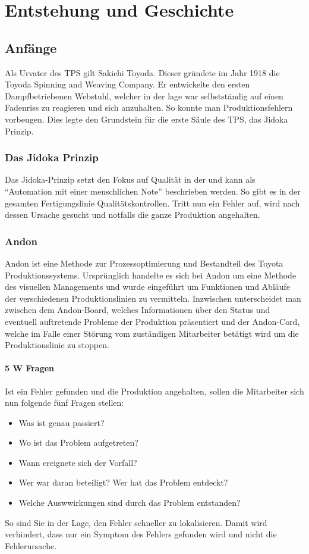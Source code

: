 \documentclass[00_ToyotaProduktionssystem.tex]{subfiles}
\begin{document}
\chapter{Entstehung und Geschichte}
\label{chap:ENTSTEHUNG}
\section{Anfänge}
Als Urvater des TPS gilt Sakichi Toyoda. Dieser gründete im Jahr 1918 die Toyoda Spinning and Weaving Company. Er entwickelte den ersten Dampfbetriebenen Webstuhl, welcher in der lage war selbstständig auf einen Fadenriss zu reagieren und sich anzuhalten. So konnte man Produktionsfehlern vorbeugen. Dies legte den Grundstein für die erste Säule des TPS, das Jidoka Prinzip.
\subsection{Das Jidoka Prinzip}
Das Jidoka-Prinzip setzt den Fokus auf Qualität in der  und kann als “Automation mit einer menschlichen Note” beschrieben werden. So gibt es in der gesamten Fertigungslinie Qualitätskontrollen. Tritt nun ein Fehler auf, wird nach dessen Ursache gesucht und notfalls die ganze Produktion angehalten.
\subsection{Andon}
Andon ist eine Methode zur Prozessoptimierung und Bestandteil des Toyota Produktionssystems. Ursprünglich handelte es sich bei Andon um eine Methode des visuellen Managements und wurde eingeführt um Funktionen und Abläufe der verschiedenen Produktionslinien zu vermitteln. Inzwischen unterscheidet man zwischen dem Andon-Board, welches Informationen über den Status und eventuell auftretende Probleme der Produktion präsentiert und der Andon-Cord, welche im Falle einer Störung vom zuständigen Mitarbeiter betätigt wird um die Produktionslinie zu stoppen.

\subsubsection{5 W Fragen}
Ist ein Fehler gefunden und die Produktion angehalten, sollen die Mitarbeiter sich nun folgende fünf Fragen stellen:
\begin{itemize}
\item{Was ist genau passiert?}
\item{Wo ist das Problem aufgetreten?}
\item{Wann ereignete sich der Vorfall?}
\item{Wer war daran beteiligt? Wer hat das Problem entdeckt?}
\item{Welche Auswwirkungen sind durch das Problem entstanden?}
\end{itemize}
So sind Sie in der Lage, den Fehler schneller zu lokalisieren. Damit wird verhindert, dass nur ein Symptom des Fehlers gefunden wird und nicht die Fehlerursache.
\end{document}
